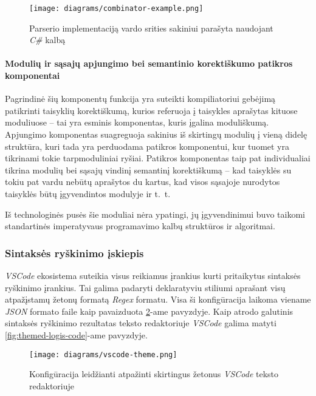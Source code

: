 \begin{activities}
{        \begin{figure}
            \centering
            \texttt{[image: diagrams/combinator-example.png]}
            \caption{Parserio implementaciją vardo srities sakiniui parašyta naudojant \textit{C\#} kalbą}
            \label{fig:combinator-example}
        \end{figure}

        \newpage

        \paragraph{Modulių ir sąsajų apjungimo bei semantinio korektiškumo patikros komponentai}

        Pagrindinė šių komponentų funkcija yra suteikti kompiliatoriui gebėjimą patikrinti taisyklių korektiškumą, kurios referuoja į taisykles aprašytas kituose moduliuose -- tai yra esminis komponentas, kuris įgalina moduliškumą. Apjungimo komponentas suagreguoja sakinius iš skirtingų modulių į vieną didelę struktūra, kuri tada yra perduodama patikros komponentui, kur tuomet yra tikrinami tokie tarpmoduliniai ryšiai. Patikros komponentas taip pat individualiai tikrina modulių bei sąsajų vindinį semantinį korektiškumą -- kad taisyklės su tokiu pat vardu nebūtų aprašytos du kartus, kad visos sąsajoje nurodytos taisyklės būtų įgyvendintos modulyje ir \hbox{t. t.}

        Iš technologinės pusės šie moduliai nėra ypatingi, jų įgyvendinimui buvo taikomi standartinės imperatyvaus programavimo kalbų struktūros ir algoritmai.
    
        \subsubsection{Sintaksės ryškinimo įskiepis}

        \textit{VSCode} ekosistema suteikia visus reikiamus įrankius kurti pritaikytus sintaksės ryškinimo įrankius. Tai galima padaryti deklaratyviu stiliumi aprašant visų atpažįstamų žetonų formatą \textit{Regex} formatu. Visa ši konfigūracija laikoma viename \textit{JSON} formato faile kaip pavaizduota \ref{fig:vscode-theme}-ame pavyzdyje. Kaip atrodo galutinis sintaksės ryškinimo rezultatas teksto redaktoriuje \textit{VSCode} galima matyti \ref{fig:themed-logis-code}-ame pavyzdyje.

        \begin{figure}
            \centering
            \texttt{[image: diagrams/vscode-theme.png]}
            \caption{Konfigūracija leidžianti atpažinti skirtingus žetonus \textit{VSCode} teksto redaktoriuje}
            \label{fig:vscode-theme}
        \end{figure}

}
\end{activities}
